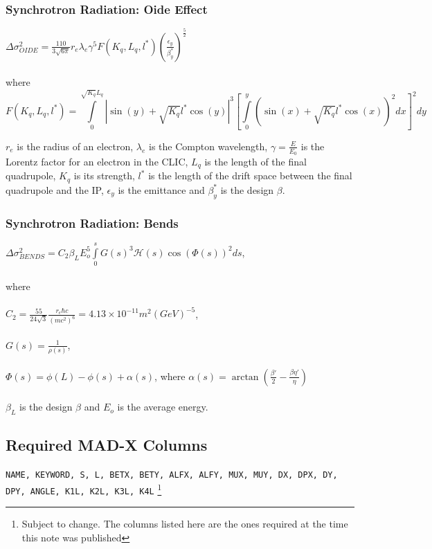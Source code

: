 \documentclass[a4paper]{cernatsnote}
\begin{document}
\subsubsection{Synchrotron Radiation: Oide Effect}
\label{ap:oide}
$\Delta \sigma^2_{OIDE} = \frac{110}{3\sqrt{6\pi}} r_e \lambda_e
\gamma^5 F(K_q,L_q,l^*) (\frac{\epsilon_y}{\beta^*_y})^\frac{5}{2}$
\\\\
where
\[
F(K_q,L_q,l^*) = \int\limits_0^{\sqrt{K_q}L_q} |\sin(y) +
\sqrt{K_q}l^* \cos(y)|^3 \left[\int\limits_0^y (\sin(x) + \sqrt{K_q}l^*
  \cos(x))^2 dx\right]^2 dy
\]

$r_e$ is the radius of an electron, $\lambda_e$ is the Compton
wavelength, $\gamma = \frac{E}{E_0}$ is the Lorentz factor for an
electron in the CLIC, $L_q$ is the length of the final quadrupole,
$K_q$ is its strength, $l^*$ is the length of the drift space between
the final quadrupole and the IP, $\epsilon_y$ is the emittance and
$\beta_y^*$ is the design $\beta$.

\subsubsection{Synchrotron Radiation: Bends}
\label{ap:bends}
$\Delta \sigma^2_{BENDS} = C_2 \beta_L E_o^5
\int\limits_0^s G(s)^3 \mathcal{H}(s) \cos(\Phi(s))^2 ds$,
\\\\
where
\\\\
$C_2 = \frac{55}{24 \sqrt{3}} \frac{r_e \hbar c}{(mc^2)^6} = 4.13
\times 10^{-11} m^2(GeV)^{-5}$,
\\\\
$G(s) = \frac{1}{\rho (s)}$,
\\\\
$\Phi(s) = \phi(L) - \phi(s) + \alpha(s)$, where $\alpha(s) =
\arctan(\frac{\beta'}{2} - \frac{\beta \eta'}{\eta})$
\\\\
$\beta_L$ is the design $\beta$ and $E_o$ is the average energy.

\newpage
\subsection{Required MAD-X Columns}
\label{ap:columns}
\texttt{NAME, KEYWORD, S, L, BETX, BETY, ALFX, ALFY, MUX, MUY, DX, DPX,
  DY, DPY, ANGLE, K1L, K2L, K3L, K4L} \footnote{Subject to change. The
columns listed here are the ones required at the time this note was published}
\end{document}
